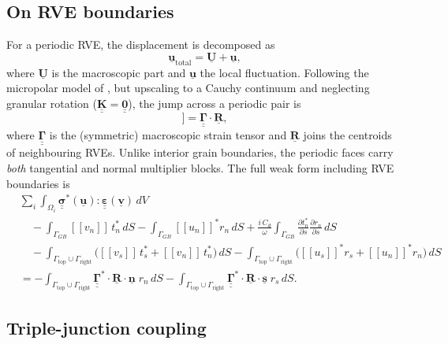 \documentclass[12pt]{article}
\newcommand{\pd}[2]{\frac{\partial{#1}}{\partial{#2}}}
\newcommand{\tensor}[1]{\underline{\underline{\boldsymbol{#1}}}}
\newcommand{\vect}[1]{\underline{\boldsymbol{#1}}}
\newcommand{\jump}[1]{[\![#1]\!]}
\begin{document}
\subsection{On RVE boundaries}

For a periodic RVE, the displacement is decomposed as
\begin{equation}
    \vect{u}_{\mathrm{total}} = \vect{U} + \vect{u},
\end{equation}
where $\vect{U}$ is the macroscopic part and $\vect{u}$ the local fluctuation.
Following the micropolar model of \citet{rudge_micropolar_2021, rudge_viscoelastic_2025}, but upscaling to a Cauchy continuum and neglecting granular rotation ($\tensor{K} = \tensor{0}$), the jump across a periodic pair is
\begin{equation}
    \jump{\vect{U}} = \tensor{\Gamma}\cdot\vect{R},
\end{equation}
where $\tensor{\Gamma}$ is the (symmetric) macroscopic strain tensor and $\vect{R}$ joins the centroids of neighbouring RVEs. Unlike interior grain boundaries, the periodic faces carry \emph{both} tangential and normal multiplier blocks. The full weak form including RVE boundaries is
\begin{equation}
\begin{aligned}
&\sum_i \int_{\Omega_i} \tensor{\sigma}^*(\vect{u}) : \tensor{\varepsilon}(\vect{v})\, dV \\
&\quad - \int_{\Gamma_{GB}} \jump{v_n}\, t_n^*\, dS
  - \int_{\Gamma_{GB}} \jump{u_n}^* r_n\, dS
  + \frac{i\,C_d}{\omega}\int_{\Gamma_{GB}}\pd{t_n^*}{s}\pd{r_n}{s}\, dS \\
&\quad - \int_{\Gamma_{\mathrm{top}}\cup\Gamma_{\mathrm{right}}}
    \bigl(\jump{v_s}\,t_s^* + \jump{v_n}\,t_n^*\bigr)\, dS
  - \int_{\Gamma_{\mathrm{top}}\cup\Gamma_{\mathrm{right}}}
    \bigl(\jump{u_s}^* r_s + \jump{u_n}^* r_n\bigr)\, dS \\
&= -\int_{\Gamma_{\mathrm{top}}\cup\Gamma_{\mathrm{right}}}
    \tensor{\Gamma}^*\cdot\vect{R}\cdot\vect{n}\; r_n\, dS
  - \int_{\Gamma_{\mathrm{top}}\cup\Gamma_{\mathrm{right}}}
    \tensor{\Gamma}^*\cdot\vect{R}\cdot\vect{s}\; r_s\, dS.
\end{aligned}
\end{equation}

\subsection{Triple-junction coupling}
\label{sec:junction}
\end{document}
